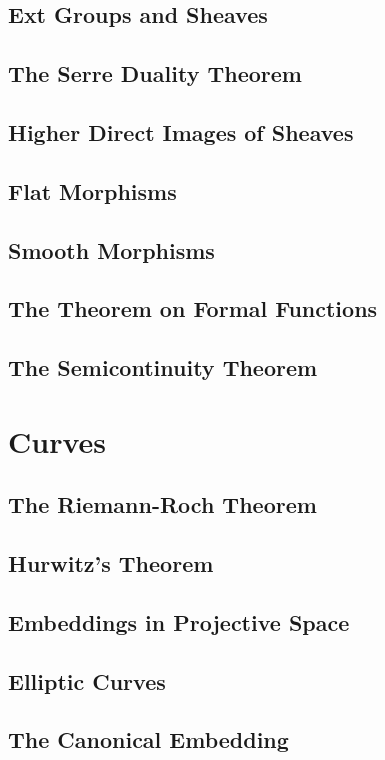 \documentclass[oneside]{amsbook}
\begin{document}
\section{Ext Groups and Sheaves}

\section{The Serre Duality Theorem}

\section{Higher Direct Images of Sheaves}

\section{Flat Morphisms}

\section{Smooth Morphisms}

\section{The Theorem on Formal Functions}

\section{The Semicontinuity Theorem}


\chapter{Curves}
\section{The Riemann-Roch Theorem}

\section{Hurwitz's Theorem}

\section{Embeddings in Projective Space}

\section{Elliptic Curves}

\section{The Canonical Embedding}

\end{document}

